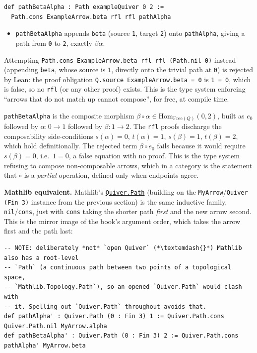 \begin{lstlisting}
def pathBetaAlpha : Path exampleQuiver 0 2 :=
  Path.cons ExampleArrow.beta rfl rfl pathAlpha
\end{lstlisting}

\begin{itemize}
\tightlist
\item
  \texttt{pathBetaAlpha} appends \texttt{beta} (source \texttt{1}, target \texttt{2}) onto \texttt{pathAlpha}, giving a path from \texttt{0} to \texttt{2}, exactly \(\beta\alpha\).
\end{itemize}

Attempting \texttt{Path.cons ExampleArrow.beta rfl rfl (Path.nil 0)} instead (appending \texttt{beta}, whose source is \texttt{1}, directly onto the trivial path at \texttt{0}) is rejected by Lean: the proof obligation \texttt{Q.source ExampleArrow.beta = 0} is \texttt{1 = 0}, which is false, so no \texttt{rfl} (or any other proof) exists. This is the type system enforcing ``arrows that do not match up cannot compose'', for free, at compile time.

\begin{mathreading}

\texttt{pathBetaAlpha} is the composite morphism \(\beta\circ\alpha \in \mathrm{Hom}_{\mathrm{Free}(Q)}(0,2)\), built as \(e_0\) followed by \(\alpha : 0\to 1\) followed by \(\beta : 1\to 2\). The \texttt{rfl} proofs discharge the composability side-conditions \(s(\alpha)=0\), \(t(\alpha)=1\), \(s(\beta)=1\), \(t(\beta)=2\), which hold definitionally. The rejected term \(\beta\circ e_0\) fails because it would require \(s(\beta) = 0\), i.e.~\(1 = 0\), a false equation with no proof. This is the type system refusing to compose non-composable arrows, which in a category is the statement that \(\circ\) is a \emph{partial} operation, defined only when endpoints agree.

\end{mathreading}

\textbf{Mathlib equivalent.} Mathlib's \href{https://loogle.lean-lang.org/?q=Quiver.Path}{\texttt{Quiver.Path}} (building on the \texttt{MyArrow}/\texttt{Quiver (Fin 3)} instance from the previous section) is the same inductive family, \texttt{nil}/\texttt{cons}, just with \texttt{cons} taking the shorter path \emph{first} and the new arrow second. This is the mirror image of the book's argument order, which takes the arrow first and the path last:

\begin{lstlisting}
-- NOTE: deliberately *not* `open Quiver` (*\textemdash{}*) Mathlib also has a root-level
-- `Path` (a continuous path between two points of a topological space,
-- `Mathlib.Topology.Path`), so an opened `Quiver.Path` would clash with
-- it. Spelling out `Quiver.Path` throughout avoids that.
def pathAlpha' : Quiver.Path (0 : Fin 3) 1 := Quiver.Path.cons Quiver.Path.nil MyArrow.alpha
def pathBetaAlpha' : Quiver.Path (0 : Fin 3) 2 := Quiver.Path.cons pathAlpha' MyArrow.beta
\end{lstlisting}

